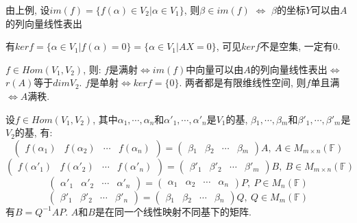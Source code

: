 \begin{example}
    由上例, 设$im(f)=\{f(\alpha) \in V_2|\alpha \in V_1\}$, 则$\beta \in im(f)$ $\Longleftrightarrow$ $\beta$的坐标$Y$可以由$A$的列向量线性表出
\end{example}

\begin{example}
    有$kerf=\{\alpha \in V_1|f(\alpha)=0\}=\{\alpha \in V_1|AX=0\}$, 可见$kerf$不是空集, 一定有$0$.
\end{example}

\begin{inference}
    $f \in Hom(V_1, V_2)$, 则:
    $f$是满射$\Longleftrightarrow$$im(f)$中向量可以由$A$的列向量线性表出$\Longleftrightarrow$$r(A)$等于$dimV_2$.
    $f$是单射$\Longleftrightarrow$$kerf=\{0\}$.
    两者都是有限维线性空间, 则$f$单且满$\Longleftrightarrow$$A$满秩.
\end{inference}

\begin{example}
    设$f \in Hom(V_1, V_2)$, 其中$\alpha{_1}, \cdots, \alpha{_n}$和$\alpha'{_1}, \cdots, \alpha'{_n}$是$V_1$的基, $\beta{_1}, \cdots, \beta{_m}$和$\beta'{_1}, \cdots, \beta'{_m}$是$V_2$的基, 有:
    \[\begin{pmatrix}
        f(\alpha{_1}) & f(\alpha{_2}) & \cdots & f(\alpha{_n})
    \end{pmatrix}=\begin{pmatrix}
        \beta{_1} & \beta{_2} & \cdots & \beta{_m}
    \end{pmatrix}A, \ A \in M_{m \times n}(\mathbb{F})\]
    \[\begin{pmatrix}
        f(\alpha'{_1}) & f(\alpha'{_2}) & \cdots & f(\alpha'{_n})
    \end{pmatrix}=\begin{pmatrix}
        \beta'{_1} & \beta'{_2} & \cdots & \beta'{_m}
    \end{pmatrix}B, \ B \in M_{m \times n}(\mathbb{F})\]
    \[\begin{pmatrix}
        \alpha'{_1} & \alpha'{_2} & \cdots & \alpha'{_n}
    \end{pmatrix}=\begin{pmatrix}
        \alpha{_1} & \alpha{_2} & \cdots & \alpha{_n}
    \end{pmatrix}P, \ P \in M_n(\mathbb{F})\]
    \[\begin{pmatrix}
        \beta'{_1} & \beta'{_2} & \cdots & \beta'{_n}
    \end{pmatrix}=\begin{pmatrix}
        \beta{_1} & \beta{_2} & \cdots & \beta{_n}
    \end{pmatrix}Q, \ Q \in M_m(\mathbb{F})\]
    有$B=Q^{-1}AP$. $A$和$B$是在同一个线性映射不同基下的矩阵.
\end{example}

